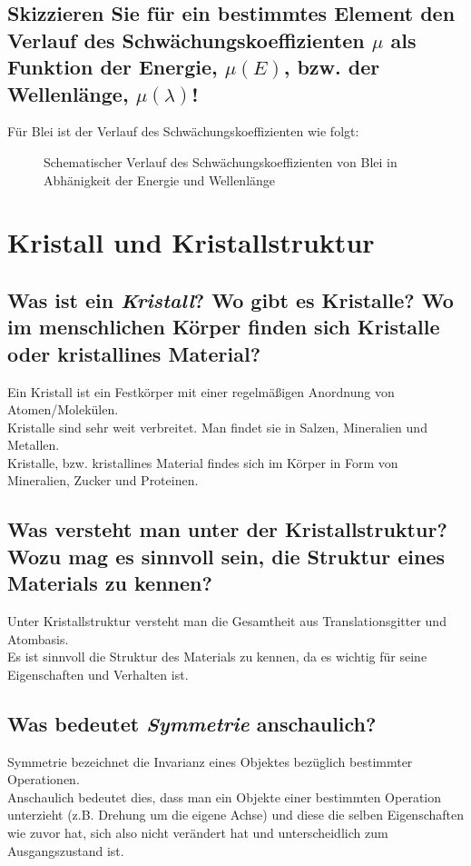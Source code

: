 \subsection*{Skizzieren Sie für ein bestimmtes Element den Verlauf des Schwächungskoeffizienten \texorpdfstring{$\mu$}{U+03BC} als Funktion der Energie, \texorpdfstring{$\mu(E)$}{U+03BC(E)}, bzw. der Wellenlänge, \texorpdfstring{$\mu(\lambda)$}{U+03BC(U+03BB)}!}
Für Blei ist der Verlauf des Schwächungskoeffizienten wie folgt:
\begin{figure}[htb]
    \centering{}
    \caption{Schematischer Verlauf des Schwächungskoeffizienten von Blei in Abhänigkeit der Energie und Wellenlänge \cite{Krieger}}
\end{figure}\newpage
\section{Kristall und Kristallstruktur}
\subsection*{Was ist ein \textit{Kristall}? Wo gibt es Kristalle? Wo im menschlichen Körper finden sich Kristalle oder kristallines Material?}
Ein Kristall ist ein Festkörper mit einer regelmäßigen Anordnung von Atomen/Molekülen.\\
Kristalle sind sehr weit verbreitet.
Man findet sie in Salzen, Mineralien und Metallen.\\
Kristalle, bzw. kristallines Material findes sich im Körper in Form von Mineralien, Zucker und Proteinen.
\subsection*{Was versteht man unter der Kristallstruktur? Wozu mag es sinnvoll sein, die Struktur eines Materials zu kennen?}
Unter Kristallstruktur versteht man die Gesamtheit aus Translationsgitter und Atombasis. \cite{Experimentalphysik3}\\
Es ist sinnvoll die Struktur des Materials zu kennen, da es wichtig für seine Eigenschaften und Verhalten ist.
\subsection*{Was bedeutet \textit{Symmetrie} anschaulich?}
Symmetrie bezeichnet die Invarianz eines Objektes bezüglich bestimmter Operationen. \cite{Schwarzenbach}\\
Anschaulich bedeutet dies, dass man ein Objekte einer bestimmten Operation unterzieht (z.B. Drehung um die eigene Achse) und diese die selben Eigenschaften wie zuvor hat, sich also nicht verändert hat und unterscheidlich zum Ausgangszustand ist.
